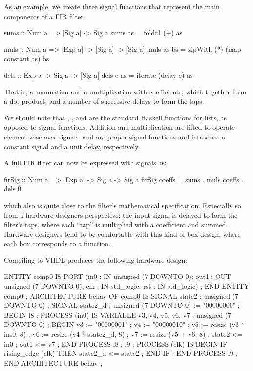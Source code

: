 \documentclass[../paper.tex]{subfiles}
\begin{document}
As an example, we create three signal functions that represent the main components of a FIR filter:

\begin{code}
sums :: Num a => [Sig a] -> Sig a
sums as = foldr1 (+) as

muls :: Num a => [Exp a] -> [Sig a] -> [Sig a]
muls as bs = zipWith (*) (map constant as) bs

dels :: Exp a -> Sig a -> [Sig a]
dels e as = iterate (delay e) as
\end{code}

\noindent That is, a summation and a multiplication with coefficients, which together form a dot product, and a number of successive delays to form the taps.

We should note that , ,  and  are the standard Haskell functions for lists, as opposed to signal functions. Addition and multiplication are lifted to operate element-wise over signals.  and  are proper signal functions and introduce a constant signal and a unit delay, respectively.

A full FIR filter can now be expressed with signals as:

\begin{code}
firSig :: Num a => [Exp a] -> Sig a -> Sig a
firSig coeffs = sums . muls coeffs . dels 0
\end{code}

\noindent which also is quite close to the filter's mathematical specification. Especially so from a hardware designers perspective: the input signal is delayed to form the filter's taps, where each ``tap'' is multiplied with a coefficient and summed. Hardware designers tend to be comfortable with this kind of box design, where each box corresponds to a function.

Compiling  to VHDL produces the following hardware design:

\begin{code}
ENTITY comp0 IS
  PORT (in0 : IN unsigned (7 DOWNTO 0);
        out1 : OUT unsigned (7 DOWNTO 0);
        clk : IN std_logic;
        rst : IN std_logic) ;
END ENTITY comp0 ;
ARCHITECTURE behav OF comp0 IS
  SIGNAL state2 : unsigned (7 DOWNTO 0) ;
  SIGNAL state2_d : unsigned (7 DOWNTO 0) := "00000000" ;
BEGIN
  l8 :
    PROCESS (in0) IS
      VARIABLE v3, v4, v5, v6, v7 : unsigned (7 DOWNTO 0) ; 
    BEGIN
      v3 := "00000001" ;
      v4 := "00000010" ;
      v5 := resize (v3 * ins0, 8) ;
      v6 := resize (v4 * state2_d, 8) ;
      v7 := resize (v5 + v6, 8) ;
      state2 <= in0 ;
      out1 <= v7 ;
    END PROCESS l8 ;
  l9 :
    PROCESS (clk) IS
    BEGIN
      IF rising_edge (clk) THEN
        state2_d <= state2 ;
      END IF ;
    END PROCESS l9 ;
END ARCHITECTURE behav ;
\end{code}
\end{document}
